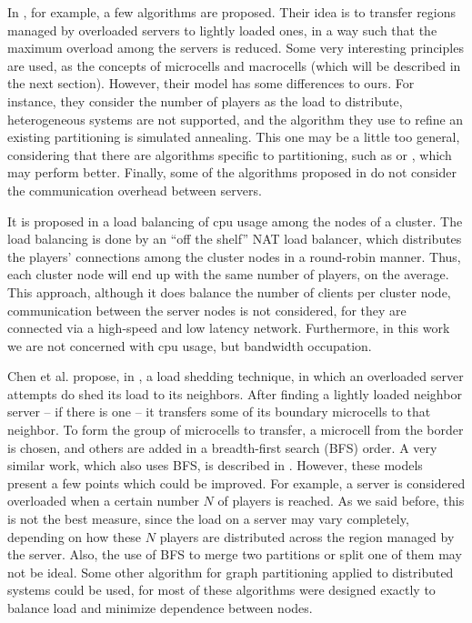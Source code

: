 In \cite{devleeschauwer2005dma}, for example, a few algorithms are proposed. Their idea is to transfer regions managed by overloaded servers to  lightly loaded ones, in a way such that the maximum overload among the servers is reduced. Some very interesting principles are used, as the concepts of microcells and macrocells (which will be described in the next section). However, their model has some differences to ours. For instance, they consider the number of players as the load to distribute, heterogeneous systems are not supported, and the algorithm they use to refine an existing partitioning is simulated annealing. This one may be a little too general, considering that there are algorithms specific to partitioning, such as \cite{kernighan1970ehp} or \cite{fiduccia1982lth}, which may perform better. Finally, some of the algorithms proposed in \cite{devleeschauwer2005dma} do not consider the communication overhead between servers.

It is proposed in \cite{lu2006lbm} a load balancing of cpu usage among the nodes of a cluster. The load balancing is done by an ``off the shelf'' NAT load balancer, which distributes the players' connections among the cluster nodes in a round-robin manner. Thus, each cluster node will end up with the same number of players, on the average. This approach, although it does balance the number of clients per cluster node, communication between the server nodes is not considered, for they are connected via a high-speed and low latency network. Furthermore, in this work we are not concerned with cpu usage, but bandwidth occupation.%

Chen et al. propose, in \cite{chen2005lad}, a load shedding technique, in which an overloaded server attempts do shed its load to its neighbors. After finding a lightly loaded neighbor server -- if there is one -- it transfers some of its boundary microcells to that neighbor. To form the group of microcells to transfer, a microcell from the border is chosen, and others are added in a breadth-first search (BFS) order. A very similar work, which also uses BFS, is described in \cite{duong2003dls}. However, these models present a few points which could be improved. For example, a server is considered overloaded when a certain number $N$ of players is reached. As we said before, this is not the best measure, since the load on a server may vary completely, depending on how these $N$ players are distributed across the region managed by the server. Also, the use of BFS to merge two partitions or split one of them may not be ideal. Some other algorithm for graph partitioning applied to distributed systems \cite{kernighan1970ehp,fiduccia1982lth,karypis1999fah,hendrickson1995isg} could be used, for most of these algorithms were designed exactly to balance load and minimize dependence between nodes.

